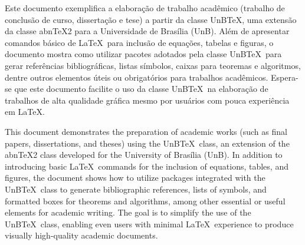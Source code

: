 \documentclass[
    oneside, %
    sumario=tradicional, %
    idioma=brazil, %
    bib=alf, %
    refback, %
    num=tradicional, %
    ]{unbtex}
\begin{document}


\membrodabancaiv{} %
\membrodabancav{} %

\begin{Resumo}
Este documento exemplifica a elaboração de trabalho acadêmico (trabalho de conclusão de curso, dissertação e tese) a partir da classe UnB\TeX, uma extensão da classe abn\TeX2 para a Universidade de Brasília (UnB). Além de apresentar comandos básico de \LaTeX\ para inclusão de equações, tabelas e figuras, o documento mostra como utilizar pacotes adotados pela classe UnB\TeX\ para gerar referências bibliográficas, listas símbolos, caixas para teoremas e algoritmos, dentre outros elementos úteis ou obrigatórios para trabalhos acadêmicos. Espera-se que este documento facilite o uso da classe UnB\TeX\ na elaboração de trabalhos de alta qualidade gráfica mesmo por usuários com pouca experiência em \LaTeX.
\end{Resumo}

\begin{Abstract}
This document demonstrates the preparation of academic works (such as final papers, dissertations, and theses) using the UnB\TeX\ class, an extension of the abn\TeX2 class developed for the University of Brasília (UnB). In addition to introducing basic \LaTeX\ commands for the inclusion of equations, tables, and figures, the document shows how to utilize packages integrated with the UnB\TeX\ class to generate bibliographic references, lists of symbols, and formatted boxes for theorems and algorithms, among other essential or useful elements for academic writing. The goal is to simplify the use of the UnB\TeX\ class, enabling even users with minimal \LaTeX\ experience to produce visually high-quality academic documents.
\end{Abstract}
\end{document}
